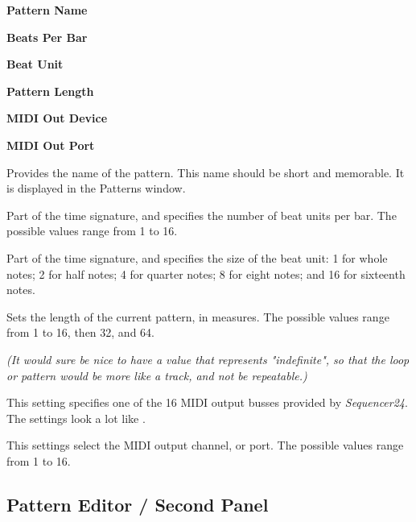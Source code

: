    \begin{enumber}
      \item \textbf{Pattern Name}
      \item \textbf{Beats Per Bar}
      \item \textbf{Beat Unit}
      \item \textbf{Pattern Length}
      \item \textbf{MIDI Out Device}
      \item \textbf{MIDI Out Port}
   \end{enumber}

   \setcounter{ItemCounter}{0}      %

   Provides the name of the pattern.
   This name should be short and memorable.
   It is displayed in the Patterns window.

   Part of the time signature, and specifies the number of beat units per bar.
   The possible values range from 1 to 16.

   Part of the time signature, and specifies the size of the beat unit:
   1 for whole notes; 2 for half notes; 4 for quarter notes; 8 for eight notes;
   and 16 for sixteenth notes.

   Sets the length of the current pattern, in measures.
   The possible values range from 1 to 16, then 32, and 64.

   \textsl{(It would sure be nice to have a value that represents
   "indefinite", so that the loop or pattern would be more like a track,
   and not be repeatable.)}

   This setting specifies one of the 16 MIDI output busses provided by
   \textsl{Sequencer24}.  The settings look a lot like
   .

   This settings select the MIDI output channel, or port.
   The possible values range from 1 to 16.

\subsection{Pattern Editor / Second Panel}
\label{subsec:seq24_pattern_editor_second}

